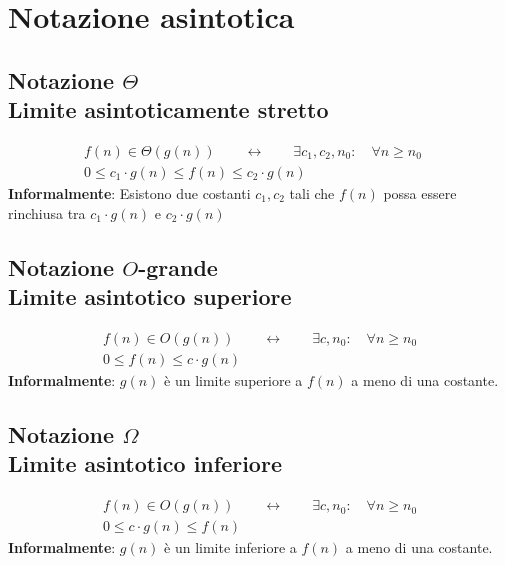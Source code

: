 \chapter{Notazione asintotica}

\section{Notazione $\Theta$\\
Limite asintoticamente stretto}
\begin{equation}\begin{aligned}
	f(n) \in \Theta(g(n)) \qquad \leftrightarrow \qquad \exists c_1, c_2, n_0: \quad \forall n \geq n_0 \quad \\
	0 \leq c_1 \cdot g(n) \leq f(n) \leq c_2 \cdot g(n)
\end{aligned}\end{equation}
\textbf{Informalmente}: Esistono due costanti $c_1, c_2$ tali che $f(n)$ possa essere rinchiusa tra $c_1 \cdot g(n)$ e $c_2 \cdot g(n)$

\section{Notazione $O$-grande\\
Limite asintotico superiore}
\begin{equation}\begin{aligned}
	f(n) \in O(g(n)) \qquad \leftrightarrow \qquad \exists c, n_0: \quad \forall n \geq n_0 \\
	0 \leq  f(n) \leq c \cdot g(n)
\end{aligned}\end{equation}
\textbf{Informalmente}: $g(n)$ è un limite superiore a $f(n)$ a meno di una costante.

\section{Notazione $\Omega$\\
Limite asintotico inferiore}
\begin{equation}\begin{aligned}
	f(n) \in O(g(n)) \qquad \leftrightarrow \qquad \exists c, n_0: \quad \forall n \geq n_0 \\
	 0 \leq c \cdot g(n) \leq  f(n)
\end{aligned}\end{equation}
\textbf{Informalmente}: $g(n)$ è un limite inferiore a $f(n)$ a meno di una costante.


